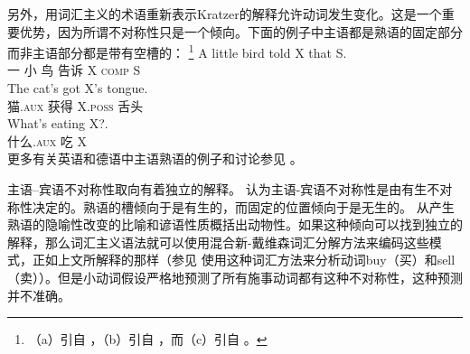     另外，用词汇主义的术语重新表示Kratzer的解释允许动词发生变化。这是一个重要优势，因为所谓不对称性只是一个倾向。下面的例子中主语都是熟语的固定部分而非主语部分都是带有空槽的：
\footnote{%
（a）引自 ，（b）引自 ，而（c）引自 。
}
\eal
\ex\label{bird}
\gll A little bird told X that S.\\
     一 小 鸟 告诉 X \textsc{comp} S\\
\ex\label{cat-tounge}
\gll The cat's got X's tongue.\\
      猫.\textsc{aux} 获得 X.\textsc{poss} 舌头\\
\ex\label{what-is-eating-x}
\gll What's eating X?.\\
     什么.\textsc{aux} 吃 X\\
\zl
更多有关英语和德语中主语熟语的例子和讨论参见 。

主语--宾语不对称性取向有着独立的解释。 \citet*{NSW94a}认为主语-宾语不对称性是由有生不对称性决定的。熟语的槽倾向于是有生的，而固定的位置倾向于是无生的。 \citet{NSW94a}从产生熟语的隐喻性改变的比喻和谚语性质概括出动物性。如果这种倾向可以找到独立的解释，那么词汇主义语法就可以使用混合新-戴维森词汇分解方法来编码这些模式，正如上文所解释的那样（参见 \citet{Wechsler2005a}使用这种词汇方法来分析动词buy（买）和sell（卖））。但是小动词假设严格地预测了所有施事动词都有这种不对称性，这种预测并不准确。

